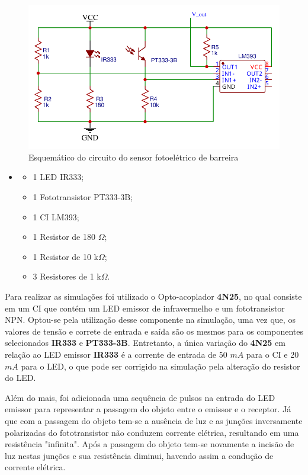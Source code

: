     \begin{figure}[H]
    \centering
    \includegraphics[scale=0.7]{figuras/Schematic_Sensor_barreira.pdf}
    \caption{Esquemático do circuito do sensor fotoelétrico de barreira}
    \label{fig:esq_sensor_barreira}
    \end{figure}
    
    \begin{itemize}
    \item[ ]
        \begin{itemize}
            \item 1 LED IR333;
            \item 1 Fototransistor PT333-3B;
            \item 1 CI LM393;
            \item 1 Resistor de 180 $\Omega$;
            \item 1 Resistor de 10 k$\Omega$;
            \item 3 Resistores de 1 k$\Omega$.
        \end{itemize}
    \end{itemize}
    
    Para realizar as simulações foi utilizado o Opto-acoplador \textbf{4N25}, no qual consiste em um CI que contém um LED emissor de infravermelho e um fototransistor NPN. Optou-se pela utilização desse componente na simulação, uma vez que, os valores de tensão e correte de entrada e saída são os mesmos para os componentes selecionados \textbf{IR333} e \textbf{PT333-3B}. Entretanto, a única variação do \textbf{4N25} em relação ao LED emissor \textbf{IR333} é a corrente de entrada de 50 $mA$ para o CI e 20 $mA$ para o LED, o que pode ser corrigido na simulação pela alteração do resistor do LED.
    
    Além do mais, foi adicionada uma sequência de pulsos na entrada do LED emissor para representar a passagem do objeto entre o emissor e o receptor. Já que com a passagem do objeto tem-se a ausência de luz e as junções inversamente polarizadas do fototransistor não conduzem corrente elétrica, resultando em uma resistência "infinita". Após a passagem do objeto tem-se novamente a incisão de luz nestas junções e sua resistência diminui, havendo assim a condução de corrente elétrica. 
    
